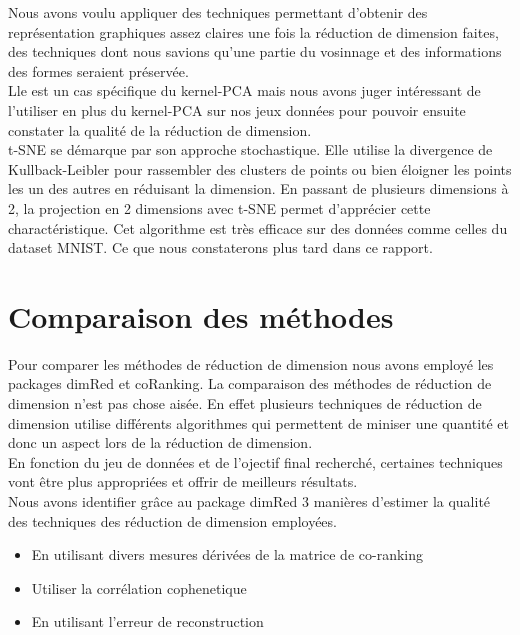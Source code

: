 \documentclass{article}
\begin{document}
\begin{multicols}{2}
Nous avons voulu appliquer des techniques permettant d'obtenir des représentation graphiques assez claires une fois la réduction de dimension faites, des techniques dont nous savions qu'une partie du vosinnage et des informations des formes seraient préservée. \\

Lle est un cas spécifique du kernel-PCA mais nous avons juger intéressant de l'utiliser en plus du kernel-PCA sur nos jeux données pour pouvoir ensuite constater la qualité de la réduction de dimension.\\

t-SNE se démarque par son approche stochastique. Elle utilise la divergence de Kullback-Leibler pour rassembler des clusters de points ou bien éloigner les points les un des autres en réduisant la dimension. En passant de plusieurs dimensions à 2, la projection en 2 dimensions avec t-SNE permet d'apprécier cette charactéristique. Cet algorithme est très efficace sur des données comme celles du dataset MNIST. Ce que nous constaterons plus tard dans ce rapport. 

\section{Comparaison des méthodes }
Pour comparer les méthodes de réduction de dimension nous avons employé les packages dimRed et coRanking. 
La comparaison des méthodes de réduction de dimension n'est pas chose aisée. En effet plusieurs techniques de réduction de dimension utilise différents algorithmes qui permettent de miniser une quantité et donc un aspect lors de la réduction de dimension. \\

En fonction du jeu de données et de l'ojectif final recherché, certaines techniques vont être plus appropriées et offrir de meilleurs résultats. \\

Nous avons identifier grâce au package dimRed 3 manières d'estimer la qualité des techniques des réduction de dimension employées. 

\begin{itemize}
    \item En utilisant divers mesures dérivées de la matrice de co-ranking
    \item Utiliser la corrélation cophenetique
    \item En utilisant l'erreur de reconstruction
\end{itemize}


\end{multicols}
\end{document}
